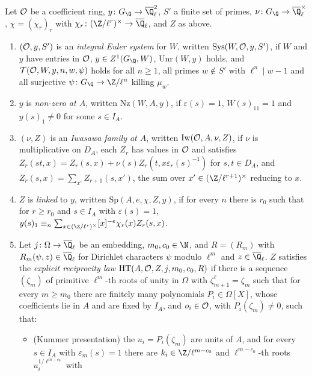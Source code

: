 \begin{definition}\label{pf:kato:def:esdata}
Let $\mathcal{O}$ be a coefficient ring, $y\colon G_\Q\to\katoQlb^2$, $S'$ a finite set of primes, $\nu\colon G_\Q\to\katoQlb^\times$,
$\chi=(\chi_r)_r$ with $\chi_r\colon(\Z/\ell^r)^\times\to\katoQlb$, and $Z$ as above.
\begin{enumerate}[label=(\alph*)]
\item $(\mathcal{O},y,S')$ is an \emph{integral Euler system} for $W$, written $\mathrm{Sys}(W,\mathcal{O},y,S')$, if $W$ and $y$ have
  entries in $\mathcal{O}$, $y\in\katoZ(G_\Q,W)$, $\mathrm{Unr}(W,y)$ holds, and $\mathcal T(\mathcal{O},W,y,n,w,\psi)$ holds for all $n\ge1$,
  all primes $w\notin S'$ with $\ell^n\mid w-1$ and all surjective $\psi\colon G_\Q\to\Z/\ell^n$ killing $\mu_w$.
\item $y$ is \emph{non-zero at $A$}, written $\mathrm{Nz}(W,A,y)$, if $\varepsilon(s)=1$, $W(s)_{11}=1$ and $y(s)_1\ne0$ for some
  $s\in I_A$.
\item $(\nu,Z)$ is an \emph{Iwasawa family at $A$}, written $\mathrm{Iw}(\mathcal{O},A,\nu,Z)$, if $\nu$ is multiplicative on $D_A$,
  each $Z_r$ has values in $\mathcal{O}$ and satisfies $Z_r(st,x)=Z_r(s,x)+\nu(s)Z_r(t,x\varepsilon_r(s)^{-1})$ for $s,t\in D_A$, and
  $Z_r(s,x)=\sum_{x'}Z_{r+1}(s,x')$, the sum over $x'\in(\Z/\ell^{r+1})^\times$ reducing to $x$.
\item $Z$ is \emph{linked} to $y$, written $\mathrm{Sp}(A,e,\chi,Z,y)$, if for every $n$ there is $r_0$ such that for $r\ge r_0$
  and $s\in I_A$ with $\varepsilon(s)=1$,
  $y(s)_1\katoeq n\sum_{x\in(\Z/\ell^r)^\times}\katorep{x}^{-e}\chi_r(x)Z_r(s,x)$.
\item Let $j\colon\Omega\to\katoQlb$ be an embedding, $m_0,c_0\in\N$, and $R=(R_m)$ with $R_m(\psi,z)\in\katoQlb$ for Dirichlet
  characters $\psi$ modulo $\ell^m$ and $z\in\katoQlb$. $Z$ satisfies the \emph{explicit reciprocity law}
  $\mathrm{HT}(A,\mathcal{O},Z,j,m_0,c_0,R)$ if there is a sequence $(\zeta_m)$ of primitive $\ell^m$-th roots of unity in $\Omega$ with
  $\zeta_{m+1}^\ell=\zeta_m$ such that for every $m\ge m_0$ there are finitely many polynomials $P_i\in\Omega[X]$, whose
  coefficients lie in $A$ and are fixed by $I_A$, and $o_i\in\mathcal{O}$, with $P_i(\zeta_m)\ne0$, such that:
  \begin{itemize}
  \item (Kummer presentation) the $u_i=P_i(\zeta_m)$ are units of $A$, and for every $s\in I_A$ with $\varepsilon_m(s)=1$ there are
    $k_i\in\Z/\ell^{m-c_0}$ and $\ell^{m-c_0}$-th roots $u_i^{1/\ell^{m-c_0}}$ with

\end{itemize}
\end{enumerate}
\end{definition}
